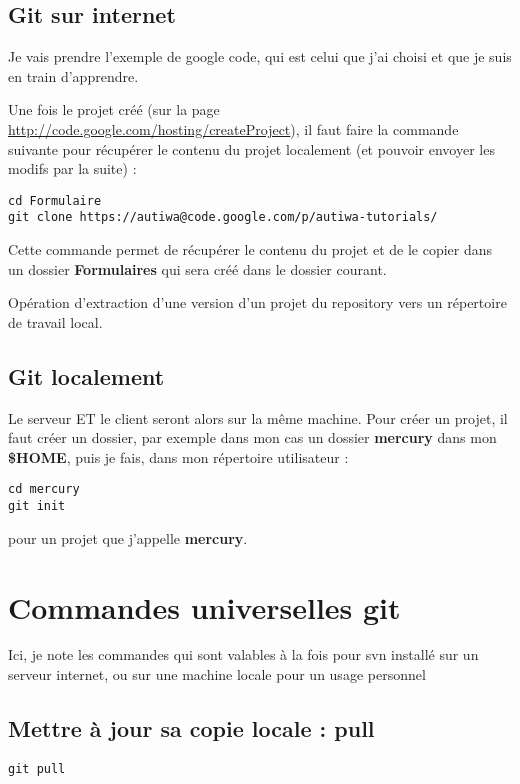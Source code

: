 \documentclass[a4paper,twoside]{article}
\begin{document}
\subsection{Git sur internet}
Je vais prendre l'exemple de google code, qui est celui que j'ai choisi et que je suis en train d'apprendre.


Une fois le projet créé (sur la page \url{http://code.google.com/hosting/createProject}), il faut faire la commande suivante pour récupérer le contenu du projet localement (et pouvoir envoyer les modifs par la suite) : 
\begin{verbatim}
cd Formulaire
git clone https://autiwa@code.google.com/p/autiwa-tutorials/ 
\end{verbatim}

Cette commande permet de récupérer le contenu du projet et de le copier dans un dossier \textbf{Formulaires} qui sera créé dans le dossier courant.

\begin{definition}[Clone]
Opération d'extraction d'une version d'un projet du repository vers un répertoire de travail local.
\end{definition}


\subsection{Git localement}\label{sec:git_init}
Le serveur ET le client seront alors sur la même machine. Pour créer un projet, il faut créer un dossier, par exemple dans mon cas un dossier \textbf{mercury} dans mon \textbf{\$HOME}, puis je fais, dans mon répertoire utilisateur : 
\begin{verbatim}
cd mercury
git init
\end{verbatim}
pour un projet que j'appelle \textbf{mercury}.

\section{Commandes universelles git}
Ici, je note les commandes qui sont valables à la fois pour svn installé sur un serveur internet, ou sur une machine locale pour un usage personnel

\subsection{Mettre à jour sa copie locale : pull} 
\begin{verbatim}
git pull
\end{verbatim}
\end{document}
